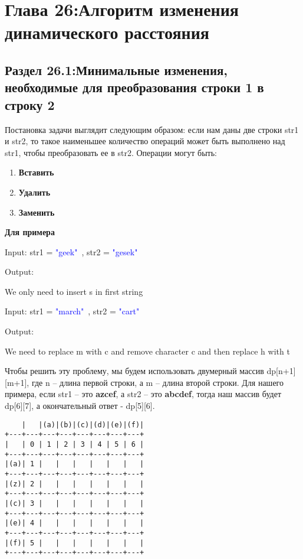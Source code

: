 \chapter*{Глава 26:Алгоритм изменения динамического  расстояния}

\section*{Раздел 26.1:Минимальные изменения, необходимые  для преобразования строки 1 в строку 2}

Постановка задачи выглядит следующим образом: если нам даны две строки str1 и str2, то такое наименьшее количество операций может быть выполнено над str1, чтобы преобразовать ее в str2. Операции могут быть:

\begin{enumerate}
    \item \textbf{Вставить}
    \item \textbf{Удалить}
    \item \textbf{Заменить}
\end{enumerate}

\textbf{Для примера}

\begin{tcolorbox}
Input: str1 = \textcolor{Blue}{"geek"\ }, str2 = \textcolor{Blue}{"gesek"\ }

Output: 

We only need to insert s in first string

Input: str1 = \textcolor{Blue}{"march"\ }, str2 = \textcolor{Blue}{"cart"\ }

Output: 

We need to replace m with c and remove character c and then replace h with t
\end{tcolorbox}

Чтобы решить эту проблему, мы будем использовать двумерный массив dp[n+1][m+1], где n -- длина первой строки, а m -- длина второй строки. Для нашего примера, если str1 -- это \textbf{azcef}, а str2 --  это \textbf{abcdef}, тогда наш массив будет dp[6][7], а окончательный ответ - dp[5][6].

\begin{tcolorbox}
\begin{verbatim}
    |   |(a)|(b)|(c)|(d)|(e)|(f)|
+---+---+---+---+---+---+---+---+
|   | 0 | 1 | 2 | 3 | 4 | 5 | 6 |
+---+---+---+---+---+---+---+---+
|(a)| 1 |   |   |   |   |   |   |   
+---+---+---+---+---+---+---+---+
|(z)| 2 |   |   |   |   |   |   |   
+---+---+---+---+---+---+---+---+
|(c)| 3 |   |   |   |   |   |   |   
+---+---+---+---+---+---+---+---+
|(e)| 4 |   |   |   |   |   |   |   
+---+---+---+---+---+---+---+---+
|(f)| 5 |   |   |   |   |   |   |   
+---+---+---+---+---+---+---+---+
\end{verbatim}
\end{tcolorbox}

